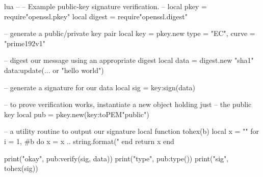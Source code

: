 \documentclass[11pt, oneside]{memoir}
\begin{document}
\begin{example}{lua}
--
-- Example public-key signature verification.
--
local pkey = require"openssl.pkey"
local digest = require"openssl.digest"

-- generate a public/private key pair
local key = pkey.new{ type = "EC", curve = "prime192v1" }

-- digest our message using an appropriate digest
local data = digest.new "sha1"
data:update(... or "hello world")

-- generate a signature for our data
local sig = key:sign(data)

-- to prove verification works, instantiate a new object holding just
-- the public key
local pub = pkey.new(key:toPEM"public")

-- a utility routine to output our signature
local function tohex(b)
	local x = ""
	for i = 1, #b do
		x = x .. string.format("%
	end
	return x
end

print("okay", pub:verify(sig, data))
print("type", pub:type())
print("sig", tohex(sig))
\end{example}



\appendix
\printindex
\end{document}
